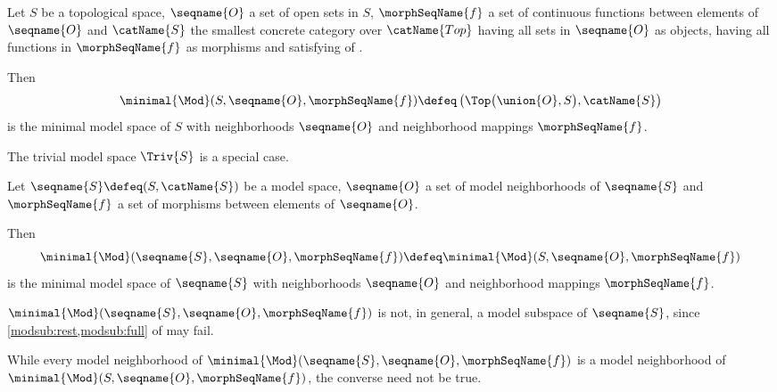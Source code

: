 \documentclass{article}
\begin{document}
\begin{definition}
\label{def:minmod}
Let $S$ be a topological space, $\seqname{O}$ a set of open sets in $S$,
$\morphSeqName{f}$ a set of continuous functions between elements of
$\seqname{O}$ and $\catName{S}$ the smallest concrete category  over
$\catName{Top}$ having all sets in $\seqname{O}$ as objects, having all
functions in $\morphSeqName{f}$ as morphisms and satisfying
 of
{
  \showlabelsinline
}.

Then
\begin{equation}
\minimal{\Mod}
  (
    S,
    \seqname{O},
    \morphSeqName{f}
  )
\defeq
  \left (
    \Top \bigl ( \union{O}, S \bigr ),
    \catName{S}
  \right )
\end{equation}
is the minimal model space of $S$ with neighborhoods $\seqname{O}$ and
neighborhood mappings $\morphSeqName{f}$.
\begin{remark}
The trivial model space $\Triv{S}$ is a special case.
\end{remark}

Let $\seqname{S} \defeq (S, \catName{S})$ be a model space,
$\seqname{O}$ a set of model neighborhoods of $\seqname{S}$ and
$\morphSeqName{f}$ a set of morphisms between elements of $\seqname{O}$.

Then
\begin{equation}
\minimal{\Mod}
  (
    \seqname{S},
    \seqname{O},
    \morphSeqName{f}
  )
\defeq
\minimal{\Mod}
  (
    S,
    \seqname{O},
    \morphSeqName{f}
  )
\end{equation}
is the minimal model space of $\seqname{S}$ with neighborhoods
$\seqname{O}$ and neighborhood mappings $\morphSeqName{f}$.

\begin{remark}
$
  \minimal{\Mod}
    (
      \seqname{S},
      \seqname{O},
      \morphSeqName{f}
    )
$
is not, in general, a model subspace of $\seqname{S}$, since
{
  \showlabelsinline
  \cref{modsub:rest,modsub:full}
}
of  may fail.

While every model neighborhood of
$\minimal{\Mod}(\seqname{S}, \seqname{O}, \morphSeqName{f})$
is a model neighborhood of
$\minimal{\Mod}(S, \seqname{O}, \morphSeqName{f})$, the converse need not
be true.
\end{remark}
\end{definition}
\end{document}
